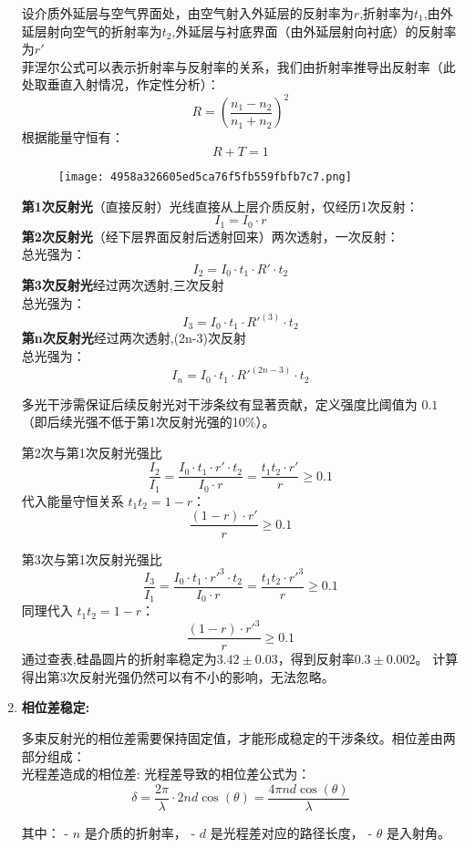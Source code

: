 \documentclass[withoutpreface,bwprint]{cumcmthesis}
\begin{document}
\begin{enumerate}
	设介质外延层与空气界面处，由空气射入外延层的反射率为$r$,折射率为$t_1$,由外延层射向空气的折射率为$t_2$,外延层与衬底界面（由外延层射向衬底）的反射率为$r'$\\
	菲涅尔公式可以表示折射率与反射率的关系，我们由折射率推导出反射率（此处取垂直入射情况，作定性分析）：
	$$R = \left( \frac{n_1 - n_2}{n_1 + n_2} \right)^2 $$
	根据能量守恒有：\[ R + T = 1 \]
	\begin{figure}[H]
		\centering
		\texttt{[image: 4958a326605ed5ca76f5fb559fbfb7c7.png]}
		\caption{}
	\end{figure}
\textbf{第1次反射光}（直接反射）光线直接从上层介质反射，仅经历1次反射：
		\[ I_1 = I_0 \cdot r \]
		\textbf{第2次反射光}（经下层界面反射后透射回来）两次透射，一次反射： \\
	    总光强为：
	    \[ I_2 = I_0 \cdot t_1 \cdot R' \cdot t_2  \]
	    \textbf{第3次反射光}经过两次透射,三次反射\\
	    总光强为：
	    \[ I_3 = I_0 \cdot t_1 \cdot R'^{(3)} \cdot t_2  \]
	    \textbf{第n次反射光}经过两次透射,(2n-3)次反射\\
	    总光强为：
	    \[ I_n = I_0 \cdot t_1 \cdot R'^{(2n-3)} \cdot t_2  \]
	    
	    多光干涉需保证后续反射光对干涉条纹有显著贡献，定义强度比阈值为 \( 0.1 \)（即后续光强不低于第1次反射光强的10\%）。
	    
	    第2次与第1次反射光强比
	    \[
	    \frac{I_2}{I_1} = \frac{I_0 \cdot t_1 \cdot r' \cdot t_2}{I_0 \cdot r} = \frac{t_1t_2 \cdot r'}{r} \geq 0.1
	    \]
	    代入能量守恒关系 \( t_1t_2 = 1 - r \)：
	    \[
	    \frac{(1 - r) \cdot r'}{r} \geq 0.1 \tag{5}
	    \]
	    
	    第3次与第1次反射光强比
	    \[
	    \frac{I_3}{I_1} = \frac{I_0 \cdot t_1 \cdot r'^3 \cdot t_2}{I_0 \cdot r} = \frac{t_1t_2 \cdot r'^3}{r} \geq 0.1
	    \]
	    同理代入 \( t_1t_2 = 1 - r \)：
	    \[
	    \frac{(1 - r) \cdot r'^3}{r} \geq 0.1 \tag{6}
	    \]
	    通过查表,硅晶圆片的折射率稳定为$3.42 \pm 0.03$，得到反射率$0.3  \pm 0.002$。
	    计算得出第3次反射光强仍然可以有不小的影响，无法忽略。
	\item \textbf{相位差稳定:}  
	  
	多束反射光的相位差需要保持固定值，才能形成稳定的干涉条纹。相位差由两部分组成：\\
	 光程差造成的相位差:
	 光程差导致的相位差公式为：
	 \[
	 \delta = \frac{2\pi}{\lambda} \cdot 2nd \cos(\theta) = \frac{4\pi nd \cos(\theta)}{\lambda}
	 \]
	 
	 其中：
	 - \(n\) 是介质的折射率，
	 - \(d\) 是光程差对应的路径长度，
	 - \(\theta\) 是入射角。
	 

\end{enumerate}
\end{document}
